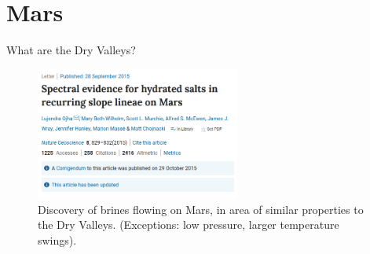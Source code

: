 \documentclass{beamer}
\begin{document}
\section{Mars}

\begin{frame}{What are the Dry Valleys?}
\begin{figure}
\centering
\includegraphics[width=0.6\textwidth]{paper.png}
\caption{\label{fig:mars} Discovery of brines flowing on Mars, in area of similar properties to the Dry Valleys.  (Exceptions: low pressure, larger temperature swings).}
\end{figure}
\end{frame}
\end{document}
